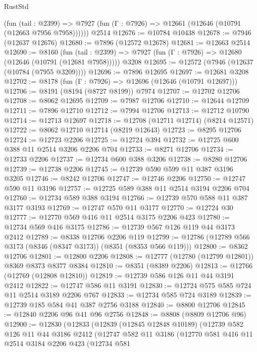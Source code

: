 \begin{lexlean}{RustStd}
\begin{coremodule}
      (fun (tail : @2399) =>
      @7927 (fun (Γ : @7926) => @12661 (@12646 (@10791 (@12663 @7956 @7958))))))
    @2514
@12676 := @10784 @10438
@12678 := @7946 (@12637 @12676)
@12680 := @7896 (@12572 @12678)
@12681 := @12663 @2514
@12690 := @8160
    (fun (tail : @2399) => @7927 (fun (Γ : @7926) => @12680 (@12646 (@10791 (@12681 @7958)))))
    @3208
@12695 := @12572 (@7946 (@12637 (@10784 (@7955 @3209))))
@12696 := @7896 @12695
@12697 := @12681 @3208
@12702 := @8178 (fun (Γ : @7926) => @12696 (@12646 (@10791 @12697)))
@12706 := @8191 (@8194 (@8727 @8199)) @7974
@12707 := @12702 @12706
@12708 := @8062 @12695
@12709 := @7987 @12706
@12710 := @12644 @12709
@12711 := @7896 @12710
@12712 := @7994 @12706
@12713 := @12712 @10790
@12714 := @12713 @12697
@12718 := @12708 (@12711 @12714) (@8214 @12571)
@12722 := @8062 @12710 @12714 (@8219 @12643)
@12723 := @8295 @12706
@12724 := @12723 @2206
@12725 := @12724 @394
@12732 := @12725 @600 @388 @11 @2514 @3206 @2206 @704
@12733 := @8271 @12706
@12734 := @12733 @2206
@12737 := @12734 @600 @388 @3206
@12738 := @8280 @12706
@12739 := @12738 @2206
@12745 := @12739 @590 @599 @11 @387 @3196 @3205
@12746 := @8242 @12706
@12747 := @12746 @2206
@12750 := @12747 @590 @11 @3196
@12757 := @12725 @589 @388 @11 @2514 @3194 @2206 @704
@12760 := @12734 @589 @388 @3194
@12766 := @12739 @570 @588 @11 @387 @3177 @3193
@12769 := @12747 @570 @11 @3177
@12770 := @12724 @30
@12777 := @12770 @569 @416 @11 @2514 @3175 @2206 @423
@12780 := @12734 @569 @416 @3175
@12786 := @12739 @567 @126 @119 @44 @3173 @2412
@12789 := @8338 @12706 @2206 @119
@12799 := @12786 (@12789 @566 @3173 (@8346 (@8347 @3173)) (@8351 (@8353 @566 @119)))
@12800 := @8362 @12706
@12801 := @12800 @2206
@12808 := @12777 (@12780 (@12799 @12801)) @8369 @8373 @8377 @8384
@12810 := @8351 (@8389 @2206)
@12813 := @12766 (@12769 (@12808 @12810))
@12819 := @12739 @586 @126 @11 @44 @3191 @2412
@12822 := @12747 @586 @11 @3191
@12830 := @12724 @575 @585 @724 @11 @2514 @3189 @2206 @767
@12833 := @12734 @585 @724 @3189
@12839 := @12739 @185 @584 @41 @387 @2756 @3188
@12840 := @8800 @12706
@12845 := @12840 @2206 @96 @41 @96 @2756
@12848 := @8808 (@8809 @12706 @96)
@12900 := @12830
    (@12833
      (@12839
        (@12845 @12848 @10189)
        (@12739
          @582
          @126
          @11
          @44
          @3186
          @2412
          (@12747
            @582
            @11
            @3186
            (@12770
              @581
              @416
              @11
              @2514
              @3184
              @2206
              @423
              (@12734
                @581

\end{coremodule}
\end{lexlean}
